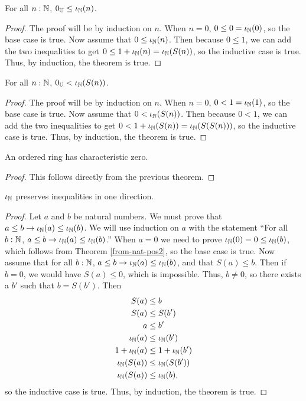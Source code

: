 \documentclass[../math.tex]{subfiles}
\begin{document}
\begin{theorem} \label{from-nat-pos2}
    For all $n : \mathbb{N}$, $0_{\mathbb{U}} \leq \iota_{\mathbb{N}}(n)$.
\end{theorem}
\begin{proof}
    The proof will be by induction on $n$.  When $n = 0$, $0 \leq 0 = \iota_{\mathbb{N}}(0)$,
    so the base case is true.  Now assume that $0 \leq \iota_{\mathbb{N}}(n)$.  Then because $0
    \leq 1$, we can add the two inequalities to get $0 \leq 1 + \iota_{\mathbb{N}}(n) =
    \iota_{\mathbb{N}}(S(n))$, so the inductive case is true.  Thus, by induction, the theorem
    is true.
\end{proof}

\begin{theorem} \label{from-nat-pos}
    For all $n : \mathbb{N}$, $0_{\mathbb{U}} < \iota_{\mathbb{N}}(S(n))$.
\end{theorem}
\begin{proof}
    The proof will be by induction on $n$.  When $n = 0$, $0 < 1 = \iota_{\mathbb{N}}(1)$, so
    the base case is true.  Now assume that $0 < \iota_{\mathbb{N}}(S(n))$.  Then because $0 <
    1$, we can add the two inequalities to get $0 < 1 + \iota_{\mathbb{N}}(S(n)) =
    \iota_{\mathbb{N}}(S(S(n)))$, so the inductive case is true.  Thus, by induction, the
    theorem is true.
\end{proof}

\begin{instance}
    An ordered ring has characteristic zero.
\end{instance}
\begin{proof}
    This follows directly from the previous theorem.
\end{proof}

\begin{instance}
    $\iota_{\mathbb{N}}$ preserves inequalities in one direction.
\end{instance}
\begin{proof}
    Let $a$ and $b$ be natural numbers.  We must prove that $a \leq b
    \rightarrow \iota_{\mathbb{N}}(a) \leq \iota_{\mathbb{N}}(b)$.  We will use induction on $a$ with the
    statement ``For all $b : \mathbb{N}$, $a \leq b \rightarrow \iota_{\mathbb{N}}(a) \leq \iota_{\mathbb{N}}(b)$.''
    When $a = 0$ we need to prove $\iota_{\mathbb{N}}(0) = 0 \leq \iota_{\mathbb{N}}(b)$, which follows from
    Theorem \ref{from-nat-pos2}, so the base case is true.  Now assume that for
    all $b : \mathbb{N}$, $a \leq b \rightarrow \iota_{\mathbb{N}}(a) \leq \iota_{\mathbb{N}}(b)$, and that $S(a) \leq
    b$.  Then if $b = 0$, we would have $S(a) \leq 0$, which is impossible.
    Thus, $b \neq 0$, so there exists a $b'$ such that $b = S(b')$.  Then
    \begin{align*}
        S(a) &\leq b \\
        S(a) &\leq S(b') \\
        a &\leq b' \\
        \iota_{\mathbb{N}}(a) &\leq \iota_{\mathbb{N}}(b') \\
        1 + \iota_{\mathbb{N}}(a) &\leq 1 + \iota_{\mathbb{N}}(b') \\
        \iota_{\mathbb{N}}(S(a)) &\leq \iota_{\mathbb{N}}(S(b')) \\
        \iota_{\mathbb{N}}(S(a)) &\leq \iota_{\mathbb{N}}(b),
    \end{align*}
    so the inductive case is true.  Thus, by induction, the theorem is true.
\end{proof}
\end{document}
